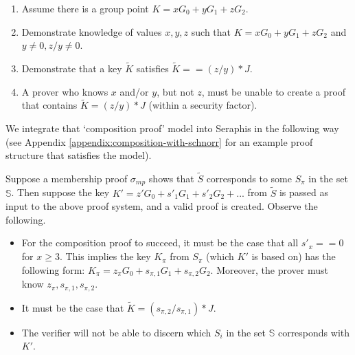 \begin{enumerate}
    \item Assume there is a group point $K = x G_0 + y G_1 + z G_2$.

    \item Demonstrate knowledge of values $x, y, z$ such that $K = x G_0 + y G_1 + z G_2$ and $y \neq 0, z/y \neq 0$.

    \item Demonstrate that a key $\tilde{K}$ satisfies $\tilde{K} == (z/y)*J$.

    \item A prover who knows $x$ and/or $y$, but not $z$, must be unable to create a proof that contains $\tilde{K} = (z/y)*J$ (within a security factor).
\end{enumerate}


We integrate that `composition proof' model into Seraphis in the following way (see Appendix \ref{appendix:composition-with-schnorr} for an example proof structure that satisfies the model).

Suppose a membership proof $\sigma_{mp}$ shows that $\tilde{S}$ corresponds to some $S_{\pi}$ in the set $\mathbb{S}$. Then suppose the key $K' = z' G_0 + s'_1 G_1 + s'_2 G_2 + ...$ from $\tilde{S}$ is passed as input to the above proof system, and a valid proof is created. Observe the following.

\begin{itemize}
    \item For the composition proof to succeed, it must be the case that all $s'_x == 0$ for $x \geq 3$. This implies the key $K_{\pi}$ from $S_{\pi}$ (which $K'$ is based on) has the following form: $K_{\pi} = z_{\pi} G_0 + s_{\pi, 1} G_1 + s_{\pi, 2} G_2$. Moreover, the prover must know $z_{\pi}, s_{\pi, 1}, s_{\pi, 2}$.

    \item It must be the case that $\tilde{K} = (s_{\pi, 2}/ s_{\pi, 1})*J$.

    \item The verifier will not be able to discern which $S_i$ in the set $\mathbb{S}$ corresponds with $K'$.
\end{itemize}

